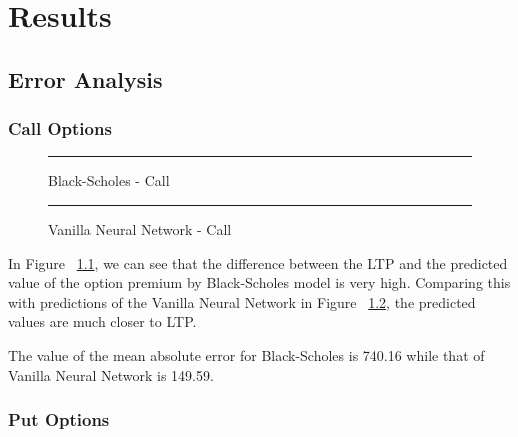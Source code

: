
\chapter{Results} %

\label{Chapter6} %


\section{Error Analysis}
\subsection{Call Options}

\begin{figure}[htbp]
  \centering
    
    \rule{35em}{0.5pt}
  \caption[Black-Scholes - Call]{Black-Scholes - Call}
  \label{fig:bs_preds_call}
\end{figure}

\begin{figure}[htbp]
  \centering
    
    \rule{35em}{0.5pt}
  \caption[Vanilla Neural Network - Call]{Vanilla Neural Network - Call}
  \label{fig:nn_preds_call}
\end{figure}

In Figure ~\ref{fig:bs_preds_call}, we can see that the difference between the LTP and the predicted value of the option premium by Black-Scholes model is very high. Comparing this with predictions of the Vanilla Neural Network in Figure ~\ref{fig:nn_preds_call}, the predicted values are much closer to LTP.

The value of the mean absolute error for Black-Scholes is 740.16 while that of Vanilla Neural Network is 149.59.

\subsection{Put Options}

